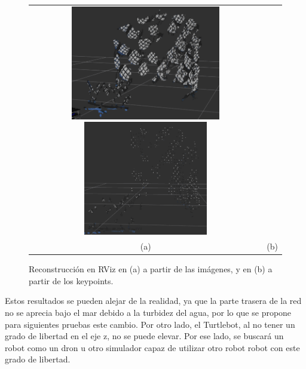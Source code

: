 \begin{figure} [!h]
    \begin{center}
    \begin{tabular}{cc}
    \includegraphics[height=5cm]{images/rviz_2}
    \includegraphics[height=5cm]{images/rviz_3} \\
    (a) & (b)
    \end{tabular}
    \caption{\label{fig:sim_ros_1}Reconstrucción en RViz en (a) a partir de las imágenes, y en (b) a partir de los keypoints.}
    \end{center}
\end{figure}

Estos resultados se pueden alejar de la realidad, ya que la parte trasera de la red no se aprecia bajo el mar debido a la turbidez del agua, por lo que se propone para siguientes pruebas este cambio. Por otro lado, el Turtlebot, al no tener un grado de libertad en el eje z, no se puede elevar. Por ese lado, se buscará un robot como un dron u otro simulador capaz de utilizar otro robot robot con este grado de libertad.
